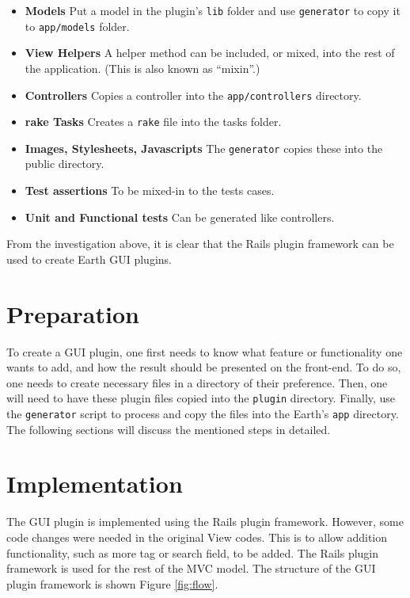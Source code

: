 \documentclass{article}
\begin{document}
\begin{itemize}
    \item{\textbf{Models}} Put a model in the plugin’s \texttt{lib} folder and use \texttt{generator} to copy it to \texttt{app/models} folder.
    \item{\textbf{View Helpers}} A helper method can be included, or mixed, into the rest of the application. (This is also known as ``mixin''.) 
    \item{\textbf{Controllers}} Copies a controller into the \texttt{app/controllers} directory. 
    \item{\textbf{rake Tasks}} Creates a \texttt{rake} file into the tasks folder.
    \item{\textbf{Images, Stylesheets, Javascripts}} The \texttt{generator} copies these into the public directory.
    \item{\textbf{Test assertions}} To be mixed-in to the tests cases.
    \item{\textbf{Unit and Functional tests}} Can be generated like controllers.
\end{itemize}

From the investigation above, it is clear that the Rails plugin framework can be used to create Earth GUI plugins.


\section{Preparation} %

To create a GUI plugin, one first needs to know what feature or functionality one wants to add, and how the result should be presented on the front-end. To do so, one needs to create necessary files in a directory of their preference. Then, one will need to have these plugin files copied into the \texttt{plugin} directory. Finally, use the \texttt{generator} script to process and copy the files into the Earth's \texttt{app} directory. The following sections will discuss the mentioned steps in detailed.


\section{Implementation} %

The GUI plugin is implemented using the Rails plugin framework. However, some code changes were needed in the original View codes. This is to allow addition functionality, such as more tag or search field, to be added. The Rails plugin framework is used for the rest of the MVC model. The structure of the GUI plugin framework is shown Figure \ref{fig:flow}.
\end{document}
